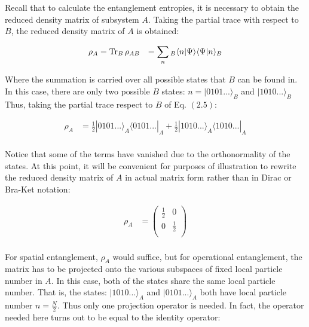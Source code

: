 \begin{samepage}
Recall that to calculate the entanglement entropies, it is necessary to obtain the reduced density matrix of subsystem $A$. Taking the partial trace with respect to $B$, the reduced density matrix of $A$ is obtained:

\begin{equation}
\begin{aligned}
\rho_{A} &= \operatorname{Tr}_{B} \rho_{AB} &= \sum_{n} {}_B \langle n | \Psi \rangle \langle \Psi | n \rangle_{B} \\
\end{aligned}
\end{equation}

Where the summation is carried over all possible states that $B$ can be found in. In this case, there are only two possible $B$ states: $n = |0101...\rangle_{B}$ and $|1010...\rangle_{B} $Thus, taking the partial trace respect to $B$ of Eq. $(2.5)$:

\begin{equation}
\begin{aligned}
\rho_{A} &= \frac{1}{2} | 0101... \rangle_{A} \langle 0101... |_{A} +  \frac{1}{2} | 1010... \rangle_{A} \langle 1010... |_{A} \\
\end{aligned}
\end{equation}

Notice that some of the terms have vanished due to the orthonormality of the states. At this point, it will be convenient for purposes of illustration to rewrite the reduced density matrix of $A$ in actual matrix form rather than in Dirac or Bra-Ket notation:

\begin{equation}
\begin{aligned}
\rho_{A} &= \begin{pmatrix}
\frac{1}{2} & 0 \\
0 & \frac{1}{2} \\
\end{pmatrix} \\
\end{aligned}
\end{equation}

For spatial entanglement, $\rho_{A}$ would suffice, but for operational entanglement, the matrix has to be projected onto the various subspaces of fixed local particle number in $A$. In this case, both of the states share the same local particle number. That is, the states: $|1010...\rangle_{A}$ and $|0101...\rangle_{A}$ both have local particle number $n = \frac{N}{2}$. Thus only one projection operator is needed. In fact, the operator needed here turns out to be equal to the identity operator:



\end{samepage}
